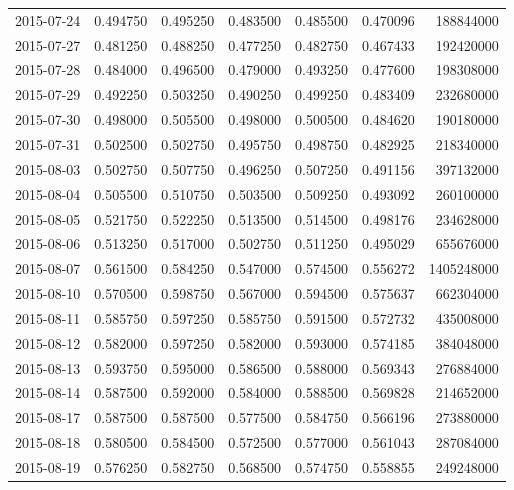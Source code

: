 \begin{tabular}{lrrrrrr}
2015-07-24 &    0.494750 &    0.495250 &    0.483500 &    0.485500 &    0.470096 &   188844000 \\
2015-07-27 &    0.481250 &    0.488250 &    0.477250 &    0.482750 &    0.467433 &   192420000 \\
2015-07-28 &    0.484000 &    0.496500 &    0.479000 &    0.493250 &    0.477600 &   198308000 \\
2015-07-29 &    0.492250 &    0.503250 &    0.490250 &    0.499250 &    0.483409 &   232680000 \\
2015-07-30 &    0.498000 &    0.505500 &    0.498000 &    0.500500 &    0.484620 &   190180000 \\
2015-07-31 &    0.502500 &    0.502750 &    0.495750 &    0.498750 &    0.482925 &   218340000 \\
2015-08-03 &    0.502750 &    0.507750 &    0.496250 &    0.507250 &    0.491156 &   397132000 \\
2015-08-04 &    0.505500 &    0.510750 &    0.503500 &    0.509250 &    0.493092 &   260100000 \\
2015-08-05 &    0.521750 &    0.522250 &    0.513500 &    0.514500 &    0.498176 &   234628000 \\
2015-08-06 &    0.513250 &    0.517000 &    0.502750 &    0.511250 &    0.495029 &   655676000 \\
2015-08-07 &    0.561500 &    0.584250 &    0.547000 &    0.574500 &    0.556272 &  1405248000 \\
2015-08-10 &    0.570500 &    0.598750 &    0.567000 &    0.594500 &    0.575637 &   662304000 \\
2015-08-11 &    0.585750 &    0.597250 &    0.585750 &    0.591500 &    0.572732 &   435008000 \\
2015-08-12 &    0.582000 &    0.597250 &    0.582000 &    0.593000 &    0.574185 &   384048000 \\
2015-08-13 &    0.593750 &    0.595000 &    0.586500 &    0.588000 &    0.569343 &   276884000 \\
2015-08-14 &    0.587500 &    0.592000 &    0.584000 &    0.588500 &    0.569828 &   214652000 \\
2015-08-17 &    0.587500 &    0.587500 &    0.577500 &    0.584750 &    0.566196 &   273880000 \\
2015-08-18 &    0.580500 &    0.584500 &    0.572500 &    0.577000 &    0.561043 &   287084000 \\
2015-08-19 &    0.576250 &    0.582750 &    0.568500 &    0.574750 &    0.558855 &   249248000 \\

\end{tabular}
